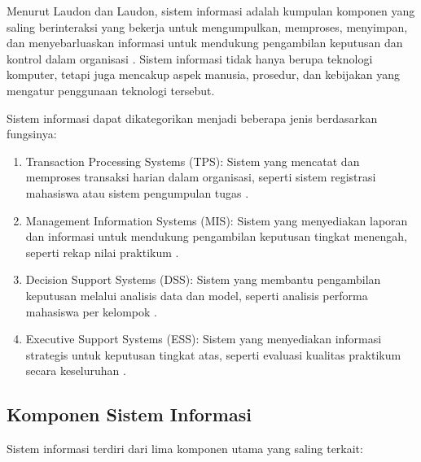 \documentclass[12pt,a4paper,twoside]{report}
\begin{document}
Menurut Laudon dan Laudon, sistem informasi adalah kumpulan komponen yang saling berinteraksi yang bekerja untuk mengumpulkan, memproses, menyimpan, dan menyebarluaskan informasi untuk mendukung pengambilan keputusan dan kontrol dalam organisasi \cite{laudon2016}. Sistem informasi tidak hanya berupa teknologi komputer, tetapi juga mencakup aspek manusia, prosedur, dan kebijakan yang mengatur penggunaan teknologi tersebut.

Sistem informasi dapat dikategorikan menjadi beberapa jenis berdasarkan fungsinya:
\begin{enumerate}
    \item Transaction Processing Systems (TPS): Sistem yang mencatat dan memproses transaksi harian dalam organisasi, seperti sistem registrasi mahasiswa atau sistem pengumpulan tugas \cite{stair2018}.
    \item Management Information Systems (MIS): Sistem yang menyediakan laporan dan informasi untuk mendukung pengambilan keputusan tingkat menengah, seperti rekap nilai praktikum \cite{stair2018}.
    \item Decision Support Systems (DSS): Sistem yang membantu pengambilan keputusan melalui analisis data dan model, seperti analisis performa mahasiswa per kelompok \cite{stair2018}.
    \item Executive Support Systems (ESS): Sistem yang menyediakan informasi strategis untuk keputusan tingkat atas, seperti evaluasi kualitas praktikum secara keseluruhan \cite{stair2018}.
\end{enumerate}

\subsection{Komponen Sistem Informasi}

Sistem informasi terdiri dari lima komponen utama yang saling terkait:
\end{document}
